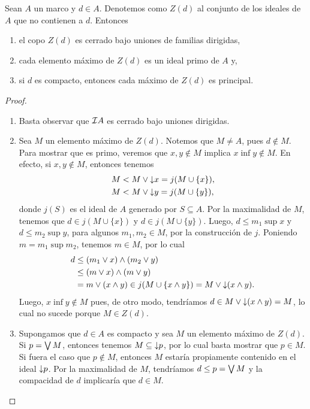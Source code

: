 \begin{lemma}
    Sean $A$ un marco y $d\in A$.
    Denotemos como $Z(d)$ al conjunto de los ideales de $A$
    que no contienen a $d$.
    Entonces
    \begin{enumerate}
        \item el copo $Z(d)$ es cerrado bajo uniones de familias
        dirigidas,
        \item cada elemento máximo de $Z(d)$ es un ideal primo de $A$ y,
        \item si $d$ es compacto, entonces cada máximo de $Z(d)$
        es principal.
    \end{enumerate}
\end{lemma}
\begin{proof}
    \begin{enumerate}
        \item Basta observar que $\cal IA$ es cerrado
        bajo uniones dirigidas.
        \item Sea $M$ un elemento máximo de $Z(d)$.
        Notemos que $M\neq A$, pues $d\nin M$.
        Para mostrar que es primo, veremos que $x,y\nin M$ implica
        $x\inf y\nin M$.
        En efecto, si $x,y\nin M$,
        entonces tenemos
        \begin{align*}
            M&<M\sup \down x=j(M\cup\{x\}), \\
            M&<M\sup\down y = j(M\cup\{y\}),
        \end{align*}
        donde $j(S)$ es el ideal de $A$ generado por $S\subseteq A$.
        Por la maximalidad de $M$, tenemos que $d\in j(M\cup\{x\})$
        y $d\in j(M\cup\{y\})$.
        Luego, $d\leq m_1\sup x$ y $d\leq m_2\sup y$, para algunos
        $m_1,m_2\in M$, por la construcción de $j$.
        Poniendo $m=m_1\sup m_2$, tenemos $m\in M$, por lo cual
        \begin{align*}
            d   &\leq (m_1\sup x)\inf(m_2\sup y) \\
                &\leq (m\sup x)\inf(m\sup y) \\
                &=m\sup (x\inf y)
                \in j(M\cup\{x\inf y\})
                = M\sup\down(x\inf y).
        \end{align*}
        Luego, $x\inf y\nin M$ pues,
        de otro modo, tendríamos $d\in M\sup\down(x\inf y)=M$,
        lo cual no sucede porque $M\in Z(d)$.
        
        \item 
        Supongamos que $d\in A$ es compacto y sea $M$ un elemento
        máximo de $Z(d)$.
        Si $p=\Sup M$, entonces tenemos $M\subseteq\down p$,
        por lo cual basta mostrar que $p\in M$.
        Si fuera el caso que $p\nin M$,
        entonces $M$ estaría propiamente contenido
        en el ideal $\down p$.
        Por la maximalidad de $M$, tendríamos $d\leq p=\Sup M$
        y la compacidad de $d$ implicaría que $d\in M$.
    \end{enumerate}
\end{proof}

